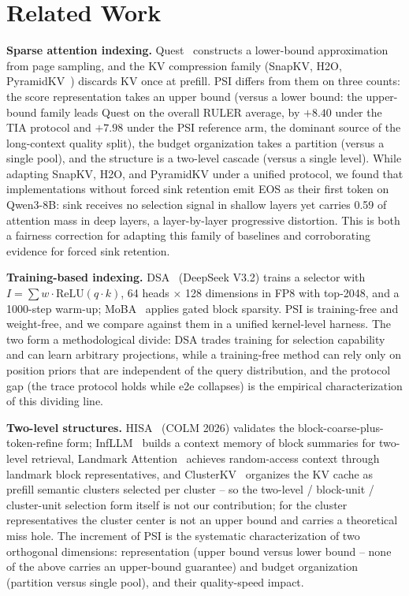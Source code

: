 \documentclass[11pt]{article}
\begin{document}
\section{Related Work}

\textbf{Sparse attention indexing.} Quest~\cite{quest} constructs a lower-bound approximation from page sampling, and the KV compression family (SnapKV, H2O, PyramidKV~\cite{snapkv,h2o,pyramidkv}) discards KV once at prefill. PSI differs from them on three counts: the score representation takes an upper bound (versus a lower bound: the upper-bound family leads Quest on the overall RULER average, by $+8.40$ under the TIA protocol and $+7.98$ under the PSI reference arm, the dominant source of the long-context quality split), the budget organization takes a partition (versus a single pool), and the structure is a two-level cascade (versus a single level). While adapting SnapKV, H2O, and PyramidKV under a unified protocol, we found that implementations without forced sink retention emit EOS as their first token on Qwen3-8B: sink receives no selection signal in shallow layers yet carries 0.59 of attention mass in deep layers, a layer-by-layer progressive distortion. This is both a fairness correction for adapting this family of baselines and corroborating evidence for forced sink retention.

\textbf{Training-based indexing.} DSA~\cite{dsa} (DeepSeek V3.2) trains a selector with $I=\sum w\cdot\mathrm{ReLU}(q\cdot k)$, 64 heads $\times$ 128 dimensions in FP8 with top-2048, and a 1000-step warm-up; MoBA~\cite{moba} applies gated block sparsity. PSI is training-free and weight-free, and we compare against them in a unified kernel-level harness. The two form a methodological divide: DSA trades training for selection capability and can learn arbitrary projections, while a training-free method can rely only on position priors that are independent of the query distribution, and the protocol gap (the trace protocol holds while e2e collapses) is the empirical characterization of this dividing line.

\textbf{Two-level structures.} HISA~\cite{hisa} (COLM 2026) validates the block-coarse-plus-token-refine form; InfLLM~\cite{infllm} builds a context memory of block summaries for two-level retrieval, Landmark Attention~\cite{landmark} achieves random-access context through landmark block representatives, and ClusterKV~\cite{clusterkv} organizes the KV cache as prefill semantic clusters selected per cluster -- so the two-level / block-unit / cluster-unit selection form itself is not our contribution; for the cluster representatives the cluster center is not an upper bound and carries a theoretical miss hole. The increment of PSI is the systematic characterization of two orthogonal dimensions: representation (upper bound versus lower bound -- none of the above carries an upper-bound guarantee) and budget organization (partition versus single pool), and their quality-speed impact.
\end{document}
